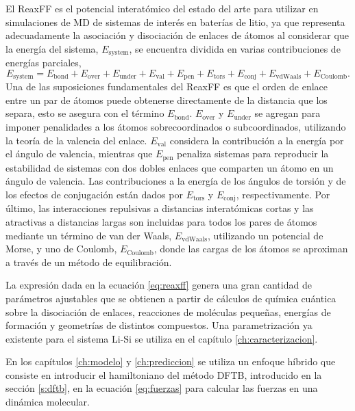 El ReaxFF \cite{reaxff} es el potencial interatómico del estado del arte para 
utilizar en simulaciones de MD de sistemas de interés en baterías de litio, ya
que representa adecuadamente la asociación y disociación de enlaces de átomos al 
considerar que la energía del sistema, $E_{\text{system}}$, se encuentra dividida
en varias contribuciones de energías parciales,
\begin{equation}\label{eq:reaxff}
    E_{\text{system}} = E_{\text{bond}} + E_{\text{over}} + E_{\text{under}} + E_{\text{val}} + E_{\text{pen}} + E_{\text{tors}} + E_{\text{conj}} + E_{\text{vdWaals}} + E_{\text{Coulomb}}.
\end{equation}
Una de las suposiciones fundamentales del ReaxFF es que el orden de enlace entre
un par de átomos puede obtenerse directamente de la distancia que los separa, 
esto se asegura con el término $E_{\text{bond}}$. $E_{\text{over}}$ y 
$E_{\text{under}}$ se agregan para imponer penalidades a los átomos 
sobrecoordinados o subcoordinados, utilizando la teoría de la valencia del enlace.
$E_{\text{val}}$ considera la contribución a la energía por el ángulo de valencia, 
mientras que $E_{\text{pen}}$ penaliza sistemas para reproducir la estabilidad de 
sistemas con dos dobles enlaces que comparten un átomo en un ángulo de valencia.
Las contribuciones a la energía de los ángulos de torsión y de los efectos de 
conjugación están dados por $E_{\text{tors}}$ y $E_{\text{conj}}$, 
respectivamente. Por último, las interacciones repulsivas a distancias 
interatómicas cortas y las atractivas a distancias largas son incluidas para 
todos los pares de átomos mediante un término de van der Waals, 
$E_{\text{vdWaals}}$, utilizando un potencial de Morse, y uno de Coulomb, 
$E_{\text{Coulomb}}$, donde las cargas de los átomos se aproximan a través de 
un método de equilibración.

La expresión dada en la ecuación \ref{eq:reaxff} genera una gran cantidad de 
parámetros ajustables que se obtienen a partir de cálculos de química cuántica
sobre la disociación de enlaces, reacciones de moléculas pequeñas, energías de 
formación y geometrías de distintos compuestos. Una parametrización ya existente
para el sistema Li-Si \cite{fan2013} se utiliza en el capítulo 
\ref{ch:caracterizacion}.

En los capítulos \ref{ch:modelo} y \ref{ch:prediccion} se utiliza un enfoque 
híbrido que consiste en introducir el hamiltoniano del método DFTB, introducido 
en la sección \ref{s:dftb}, en la ecuación \ref{eq:fuerzas} para calcular las 
fuerzas en una dinámica molecular.

